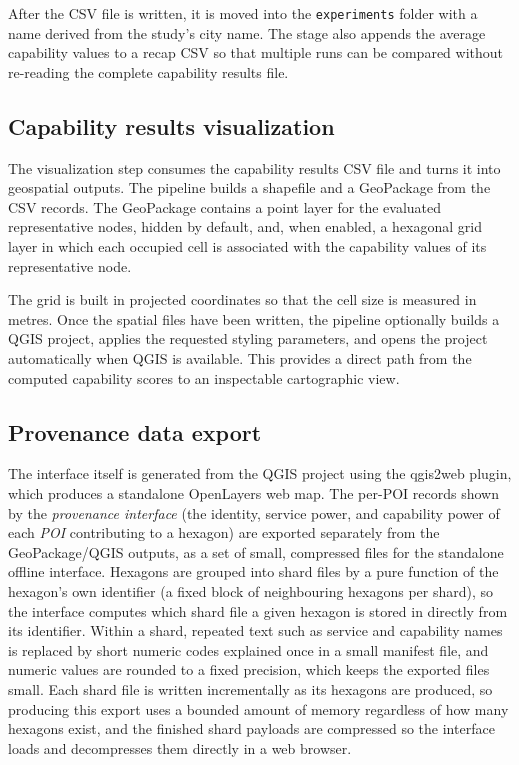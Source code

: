 \documentclass{article}
\begin{document}
After the CSV file is written, it is moved into the \texttt{experiments}
folder with a name derived from the study's city name. The stage also
appends the average capability values to a recap CSV so that multiple runs can
be compared without re-reading the complete capability results file.

\subsection{Capability results visualization}
The visualization step consumes the capability results CSV file and turns it
into geospatial outputs. The pipeline builds a shapefile and a GeoPackage from
the CSV records. The GeoPackage contains a point layer for the evaluated
representative nodes, hidden by default, and, when enabled, a hexagonal grid
layer in which each occupied cell is associated with the capability values of
its representative node.

The grid is built in projected coordinates so that the cell size is measured in
metres. Once the spatial files have been written, the pipeline optionally builds
a QGIS project, applies the requested styling parameters, and opens the project
automatically when QGIS is available. This provides a direct path from the
computed capability scores to an inspectable cartographic view.

\subsection{Provenance data export}
The interface itself is generated from the QGIS project using the qgis2web
plugin, which produces a standalone OpenLayers web map. The per-POI records
shown by the \emph{provenance interface} (the identity, service power, and
capability power of each \emph{POI} contributing to a hexagon) are exported
separately from the GeoPackage/QGIS outputs, as a set of small, compressed
files for the standalone offline interface. Hexagons are grouped into shard
files by a pure function of the hexagon's own identifier (a fixed block of
neighbouring hexagons per shard), so the interface computes which shard file
a given hexagon is stored in directly from its identifier. Within a shard,
repeated text such as service and capability names is replaced by short
numeric codes explained once in a small manifest file, and numeric values are
rounded to a fixed precision, which keeps the exported files small. Each
shard file is written incrementally as its hexagons are produced, so
producing this export uses a bounded amount of memory regardless of how many
hexagons exist, and the finished shard payloads are compressed so the
interface loads and decompresses them directly in a web browser.
\end{document}
